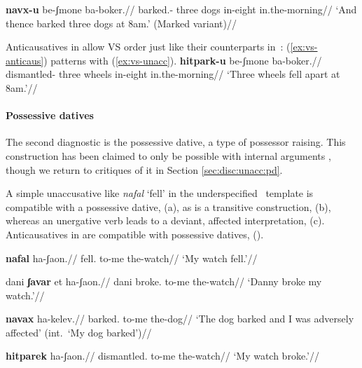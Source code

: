 \ex\label{ex:vs-unerg}\ljudge{\#} \begingl
	\gla{}\textbf{navx-u}   be-ʃmone ba-boker.//
	\glb barked.- three dogs in-eight in.the-morning//
	\glft `And thence barked three dogs at 8am.' (Marked variant)//
	\endgl
\xe

Anticausatives in {\thit} allow VS order just like their counterparts in~{\tnif}: (\ref{ex:vs-anticaus}) patterns with (\ref{ex:vs-unacc}).
\ex\label{ex:vs-anticaus} \begingl
	\gla{}\textbf{hitpark-u}   be-ʃmone ba-boker.//
	\glb dismantled- three wheels in-eight in.the-morning//
	\glft `Three wheels fell apart at 8am.'//
	\endgl
\xe

\paragraph{Possessive datives}
The second diagnostic is the possessive dative, a type of possessor raising. This construction has been claimed to only be possible with internal arguments \citep{borergrodzinsky86}, though we return to critiques of it in Section \ref{sec:disc:unacc:pd}.

A simple unaccusative like \emph{nafal} `fell' in the underspecified \tkal~template is compatible with a possessive dative, (\nextx a), as is a transitive construction, (\nextx b), whereas an unergative verb leads to a deviant, affected interpretation, (\nextx c). Anticausatives in {\thit} are compatible with possessive datives, (\anextx).

\pex 
\a
\begingl
\gla{}\textbf{nafal}  ha-ʃaon.//
\glb fell. to-me the-watch//
\glft `My watch fell.'//
\endgl

\a
\begingl
\gla{}dani \textbf{ʃavar}  et ha-ʃaon.//
\glb dani broke. to-me  the-watch//
\glft `Danny broke my watch.'// 
\endgl

\a \ljudge{\#}
\begingl
\gla{}\textbf{navax}  ha-kelev.//
\glb barked. to-me the-dog//
\glft `The dog barked and I was adversely affected' (int.~`My dog barked')//
\endgl
\xe

\ex
\begingl
\gla{}\textbf{hitparek}  ha-ʃaon.//
\glb dismantled. to-me the-watch//
\glft `My watch broke.'//
\endgl
\xe


